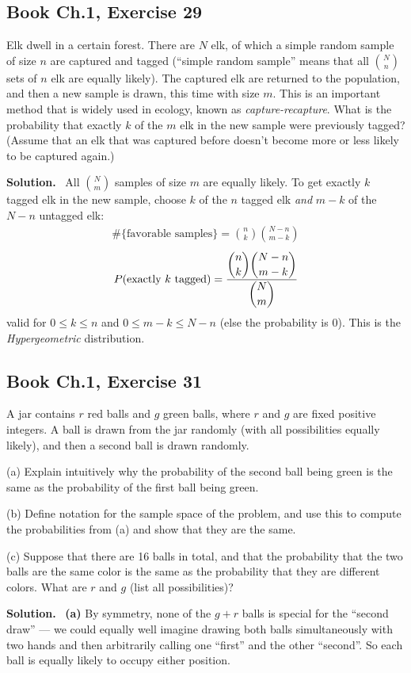 \documentclass[11pt]{article}
\newcommand{\Sol}{\vspace{2pt}\noindent\textbf{Solution.}\ }
\begin{document}
\subsection{Book Ch.1, Exercise 29}
\begin{qbox}
Elk dwell in a certain forest. There are $N$ elk, of which a simple random sample of size $n$ are captured and tagged (``simple random sample'' means that all $\binom{N}{n}$ sets of $n$ elk are equally likely). The captured elk are returned to the population, and then a new sample is drawn, this time with size $m$. This is an important method that is widely used in ecology, known as \emph{capture-recapture}. What is the probability that exactly $k$ of the $m$ elk in the new sample were previously tagged? (Assume that an elk that was captured before doesn't become more or less likely to be captured again.)
\end{qbox}
\Sol
All $\binom{N}{m}$ samples of size $m$ are equally likely. To get exactly $k$ tagged elk in the new sample, choose $k$ of the $n$ tagged elk \emph{and} $m-k$ of the $N-n$ untagged elk:
\begin{align*}
\#\{\text{favorable samples}\} = \binom{n}{k}\binom{N-n}{m-k}
\end{align*}
\begin{align*}
P(\text{exactly }k\text{ tagged}) = \frac{\dbinom{n}{k}\dbinom{N-n}{m-k}}{\dbinom{N}{m}}
\end{align*}
valid for $0\le k\le n$ and $0\le m-k\le N-n$ (else the probability is $0$). This is the \emph{Hypergeometric} distribution.

\subsection{Book Ch.1, Exercise 31}
\begin{qbox}
A jar contains $r$ red balls and $g$ green balls, where $r$ and $g$ are fixed positive integers. A ball is drawn from the jar randomly (with all possibilities equally likely), and then a second ball is drawn randomly.

(a) Explain intuitively why the probability of the second ball being green is the same as the probability of the first ball being green.

(b) Define notation for the sample space of the problem, and use this to compute the probabilities from (a) and show that they are the same.

(c) Suppose that there are 16 balls in total, and that the probability that the two balls are the same color is the same as the probability that they are different colors. What are $r$ and $g$ (list all possibilities)?
\end{qbox}
\Sol
\textbf{(a)} By symmetry, none of the $g+r$ balls is special for the ``second draw'' — we could equally well imagine drawing both balls simultaneously with two hands and then arbitrarily calling one ``first'' and the other ``second''. So each ball is equally likely to occupy either position.
\end{document}

